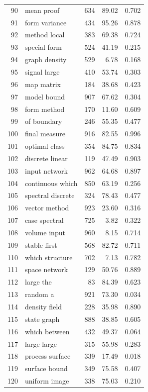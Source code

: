 \documentclass[11pt]{article}
\begin{document}
\begin{longtable}{rlrrr}
  90 & mean proof & 634 & 89.02 & 0.702 \\
  91 & form variance & 434 & 95.26 & 0.878 \\
  92 & method local & 383 & 69.38 & 0.724 \\
  93 & special form & 524 & 41.19 & 0.215 \\
  94 & graph density & 529 & 6.78 & 0.168 \\
  95 & signal large & 410 & 53.74 & 0.303 \\
  96 & map matrix & 184 & 38.68 & 0.423 \\
  97 & model bound & 907 & 67.62 & 0.304 \\
  98 & form method & 170 & 11.60 & 0.609 \\
  99 & of boundary & 246 & 55.35 & 0.477 \\
  100 & final measure & 916 & 82.55 & 0.996 \\
  101 & optimal class & 354 & 84.75 & 0.834 \\
  102 & discrete linear & 119 & 47.49 & 0.903 \\
  103 & input network & 962 & 64.68 & 0.897 \\
  104 & continuous which & 850 & 63.19 & 0.256 \\
  105 & spectral discrete & 324 & 78.43 & 0.477 \\
  106 & vector method & 923 & 23.60 & 0.316 \\
  107 & case spectral & 725 & 3.82 & 0.322 \\
  108 & volume input & 960 & 8.15 & 0.714 \\
  109 & stable first & 568 & 82.72 & 0.711 \\
  110 & which structure & 702 & 7.13 & 0.782 \\
  111 & space network & 129 & 50.76 & 0.889 \\
  112 & large the & 83 & 84.39 & 0.623 \\
  113 & random a & 921 & 73.30 & 0.034 \\
  114 & density field & 228 & 35.98 & 0.890 \\
  115 & state graph & 888 & 38.85 & 0.605 \\
  116 & which between & 432 & 49.37 & 0.064 \\
  117 & large large & 315 & 55.98 & 0.283 \\
  118 & process surface & 339 & 17.49 & 0.018 \\
  119 & surface bound & 349 & 75.58 & 0.407 \\
  120 & uniform image & 338 & 75.03 & 0.210 \\
\end{longtable}
\end{document}

